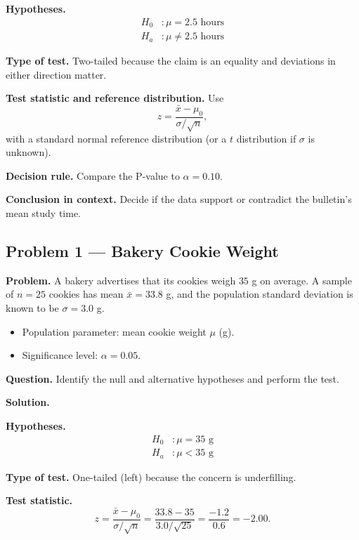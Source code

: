 	\textbf{Hypotheses.}
	\[
	\begin{aligned}
		H_0&: \mu = 2.5 \text{ hours} \\
		H_a&: \mu \neq 2.5 \text{ hours}
	\end{aligned}
	\]
	
	\textbf{Type of test.} Two-tailed because the claim is an equality and deviations in either direction matter.
	
	\textbf{Test statistic and reference distribution.} Use
	\[
	z = \frac{\bar{x}-\mu_0}{\sigma/\sqrt{n}},
	\]
	with a standard normal reference distribution (or a $t$ distribution if $\sigma$ is unknown).
	
	\textbf{Decision rule.} Compare the P-value to $\alpha=0.10$.
	
	\textbf{Conclusion in context.} Decide if the data support or contradict the bulletin's mean study time.
	
	
	\hypertarget{c2-ex1}{}
	\subsection*{Problem 1 — Bakery Cookie Weight}
	
	\textbf{Problem.} A bakery advertises that its cookies weigh $35$ g on average. A sample of $n=25$ cookies has mean $\bar{x}=33.8$ g, and the population standard deviation is known to be $\sigma=3.0$ g.
	\begin{itemize}
		\item Population parameter: mean cookie weight $\mu$ (g).
		\item Significance level: $\alpha=0.05$.
	\end{itemize}
	
	\textbf{Question.} Identify the null and alternative hypotheses and perform the test.
	
	\textbf{Solution.}
	
	\textbf{Hypotheses.}
	\[
	\begin{aligned}
		H_0&: \mu = 35 \text{ g} \\
		H_a&: \mu < 35 \text{ g}
	\end{aligned}
	\]
	
	\textbf{Type of test.} One-tailed (left) because the concern is underfilling.
	
	\textbf{Test statistic.}
	\[
	z = \frac{\bar{x}-\mu_0}{\sigma/\sqrt{n}} = \frac{33.8-35}{3.0/\sqrt{25}} = \frac{-1.2}{0.6} = -2.00.
	\]
	
